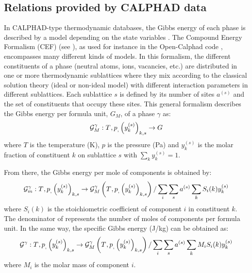 \subsection{Relations provided by CALPHAD data}

In CALPHAD-type thermodynamic databases, the Gibbs energy of each phase is described by a model depending on the state variables \cite{Lukas2007}. The Compound Energy Formalism (CEF) (see \cite{Hillert2001}), as used for instance in the Open-Calphad code \cite{Sundman2015}, encompasses many different kinds of models. In this formalism, the different constituents of a phase (neutral atoms, ions, vacancies, etc.) are distributed in one or more thermodynamic sublattices where they mix according to the classical solution theory (ideal or non-ideal model) with different interaction parameters in different sublattices. Each sublattice $s$ is defined by its number of sites $a^{(s)}$ and the set of constituents that occupy these sites. This general
formalism describes the Gibbs energy per formula unit, $G_M$, of a phase $\gamma$ as:
\begin{equation}
 \Mc{G}_{M}^{\gamma}: \temperature{}, \pressure, \left(y_{k}^{(s)}\right)_{k,s} \rightarrow G
\end{equation}
where $T$ is the temperature (K), $p$ is the pressure (Pa) and $y_{k}^{(s)}$ is the molar fraction of constituent $k$ on sublattice $s$ with $\sum_k y_{k}^{(s)} = 1$. 

From there, the Gibbs energy per mole of components is obtained by:
\begin{equation}
 \Mc{G}_{m}^{\gamma}: \temperature{}, \pressure, \left(y_{k}^{(s)}\right)_{k,s} \rightarrow \Mc{G}_{M}^{\gamma}\left(\temperature{}, \pressure, \left(y_{k}^{(s)}\right)_{k,s}\right) / \sum_i \sum_s a^{(s)} \sum_k S_i(k) y_{k}^{(s)} \label{eq:Gm1}
\end{equation}
where $S_i(k)$ is the stoichiometric coefficient of component $i$ in constituent $k$. The denominator of  represents the number of moles of components per formula unit.
In the same way, the specific Gibbs energy (J/kg) can be obtained as:
\begin{equation}
 \Mc{G}^{\gamma}: \temperature{}, \pressure, \left(y_{k}^{(s)}\right)_{k,s} \rightarrow \Mc{G}_{M}^{\gamma}\left(\temperature{}, \pressure, \left(y_{k}^{(s)}\right)_{k,s}\right) / \sum_i \sum_s a^{(s)} \sum_k M_i S_i(k) y_{k}^{(s)} \label{eq:G1}
\end{equation}
where $M_i$ is the molar mass of component $i$.

